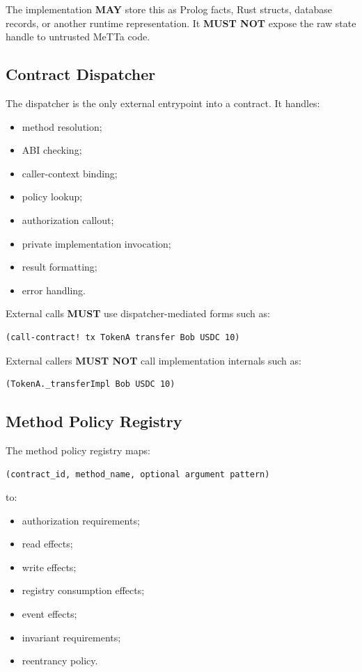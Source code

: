 \documentclass[11pt]{article}
\newcommand{\MeTTa}{MeTTa}
\newcommand{\MUST}{\textbf{MUST}}
\newcommand{\MUSTNOT}{\textbf{MUST NOT}}
\newcommand{\MAY}{\textbf{MAY}}
\begin{document}
The implementation \MAY{} store this as Prolog facts, Rust structs, database records, or another runtime representation. It \MUSTNOT{} expose the raw state handle to untrusted \MeTTa{} code.

\subsection{Contract Dispatcher}

The dispatcher is the only external entrypoint into a contract. It handles:

\begin{itemize}
  \item method resolution;
  \item ABI checking;
  \item caller-context binding;
  \item policy lookup;
  \item authorization callout;
  \item private implementation invocation;
  \item result formatting;
  \item error handling.
\end{itemize}

External calls \MUST{} use dispatcher-mediated forms such as:

\begin{lstlisting}
(call-contract! tx TokenA transfer Bob USDC 10)
\end{lstlisting}

External callers \MUSTNOT{} call implementation internals such as:

\begin{lstlisting}
(TokenA._transferImpl Bob USDC 10)
\end{lstlisting}

\subsection{Method Policy Registry}

The method policy registry maps:

\begin{lstlisting}
(contract_id, method_name, optional argument pattern)
\end{lstlisting}

to:

\begin{itemize}
  \item authorization requirements;
  \item read effects;
  \item write effects;
  \item registry consumption effects;
  \item event effects;
  \item invariant requirements;
  \item reentrancy policy.
\end{itemize}
\end{document}
